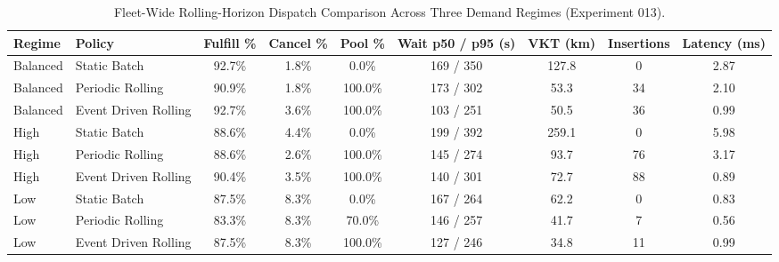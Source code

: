 \begin{table}[t]
\centering
\small
\caption{Fleet-Wide Rolling-Horizon Dispatch Comparison Across Three Demand Regimes (Experiment 013).}
\label{tab:rolling_dispatch}
\begin{tabular}{l l c c c c c c c}
\toprule
\textbf{Regime} & \textbf{Policy} & \textbf{Fulfill \%} & \textbf{Cancel \%} & \textbf{Pool \%} & \textbf{Wait p50 / p95 (s)} & \textbf{VKT (km)} & \textbf{Insertions} & \textbf{Latency (ms)} \\
\midrule
Balanced & Static Batch & 92.7\% & 1.8\% & 0.0\% & 169 / 350 & 127.8 & 0 & 2.87 \\
Balanced & Periodic Rolling & 90.9\% & 1.8\% & 100.0\% & 173 / 302 & 53.3 & 34 & 2.10 \\
Balanced & Event Driven Rolling & 92.7\% & 3.6\% & 100.0\% & 103 / 251 & 50.5 & 36 & 0.99 \\
High & Static Batch & 88.6\% & 4.4\% & 0.0\% & 199 / 392 & 259.1 & 0 & 5.98 \\
High & Periodic Rolling & 88.6\% & 2.6\% & 100.0\% & 145 / 274 & 93.7 & 76 & 3.17 \\
High & Event Driven Rolling & 90.4\% & 3.5\% & 100.0\% & 140 / 301 & 72.7 & 88 & 0.89 \\
Low & Static Batch & 87.5\% & 8.3\% & 0.0\% & 167 / 264 & 62.2 & 0 & 0.83 \\
Low & Periodic Rolling & 83.3\% & 8.3\% & 70.0\% & 146 / 257 & 41.7 & 7 & 0.56 \\
Low & Event Driven Rolling & 87.5\% & 8.3\% & 100.0\% & 127 / 246 & 34.8 & 11 & 0.99 \\
\bottomrule
\end{tabular}
\end{table}
